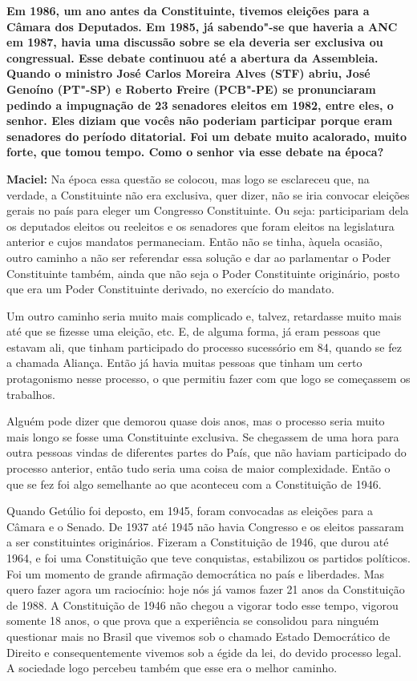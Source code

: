 \textbf{Em 1986, um ano antes da Constituinte, tivemos eleições para a
Câmara dos Deputados. Em 1985, já sabendo"-se que haveria a ANC em 1987,
havia uma discussão sobre se ela deveria ser exclusiva ou congressual.
Esse debate continuou até a abertura da Assembleia. Quando o ministro
José Carlos Moreira Alves (STF) abriu, José Genoíno (PT"-SP) e Roberto
Freire (PCB"-PE) se pronunciaram pedindo a impugnação de 23 senadores
eleitos em 1982, entre eles, o senhor. Eles diziam que vocês não
poderiam participar porque eram senadores do período ditatorial. Foi um
debate muito acalorado, muito forte, que tomou tempo. Como o senhor via
esse debate na época?}

\textbf{Maciel:} Na época essa questão se colocou, mas logo se
esclareceu que, na verdade, a Constituinte não era exclusiva, quer
dizer, não se iria convocar eleições gerais no país para eleger um
Congresso Constituinte. Ou seja: participariam dela os deputados eleitos
ou reeleitos e os senadores que foram eleitos na legislatura anterior e
cujos mandatos permaneciam. Então não se tinha, àquela ocasião, outro
caminho a não ser referendar essa solução e dar ao parlamentar o Poder
Constituinte também, ainda que não seja o Poder Constituinte originário,
posto que era um Poder Constituinte derivado, no exercício do mandato.

Um outro caminho seria muito mais complicado e, talvez, retardasse muito
mais até que se fizesse uma eleição, etc. E, de alguma forma, já eram
pessoas que estavam ali, que tinham participado do processo sucessório
em 84, quando se fez a chamada Aliança. Então já havia muitas pessoas
que tinham um certo protagonismo nesse processo, o que permitiu fazer
com que logo se começassem os trabalhos.

Alguém pode dizer que demorou quase dois anos, mas o processo seria
muito mais longo se fosse uma Constituinte exclusiva. Se chegassem de
uma hora para outra pessoas vindas de diferentes partes do País, que não
haviam participado do processo anterior, então tudo seria uma coisa de
maior complexidade. Então o que se fez foi algo semelhante ao que
aconteceu com a Constituição de 1946.

Quando Getúlio foi deposto, em 1945, foram convocadas as eleições para a
Câmara e o Senado. De 1937 até 1945 não havia Congresso e os eleitos
passaram a ser constituintes originários. Fizeram a Constituição de
1946, que durou até 1964, e foi uma Constituição que teve conquistas,
estabilizou os partidos políticos. Foi um momento de grande afirmação
democrática no país e liberdades. Mas quero fazer agora um raciocínio:
hoje nós já vamos fazer 21 anos da Constituição de 1988. A Constituição
de 1946 não chegou a vigorar todo esse tempo, vigorou somente 18 anos, o
que prova que a experiência se consolidou para ninguém questionar mais
no Brasil que vivemos sob o chamado Estado Democrático de Direito e
consequentemente vivemos sob a égide da lei, do devido processo legal. A
sociedade logo percebeu também que esse era o melhor caminho.

